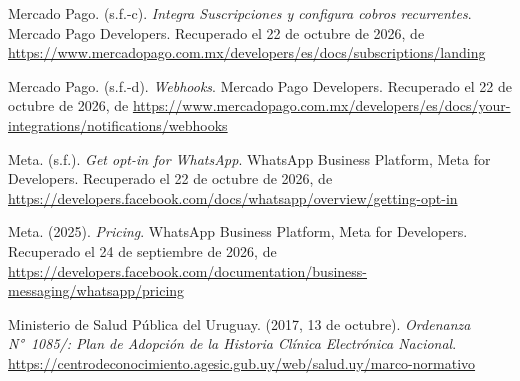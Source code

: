 \documentclass[12pt, a4paper]{article}
\begin{document}
\begin{list}{}{\setlength{\leftmargin}{1.27cm}\setlength{\itemindent}{-1.27cm}%
  \setlength{\labelwidth}{0pt}\setlength{\labelsep}{0pt}\setlength{\itemsep}{6pt}}
\item Mercado Pago. (s.f.-c). \textit{Integra Suscripciones y configura
  cobros recurrentes}. Mercado Pago Developers. Recuperado el 22 de octubre de 2026, de \url{https://www.mercadopago.com.mx/developers/es/docs/subscriptions/landing}
 
 
\item Mercado Pago. (s.f.-d). \textit{Webhooks}. Mercado Pago Developers.
  Recuperado el 22 de octubre de 2026, de \url{https://www.mercadopago.com.mx/developers/es/docs/your-integrations/notifications/webhooks}
 
 
\item Meta. (s.f.). \textit{Get opt-in for WhatsApp}. WhatsApp Business
  Platform, Meta for Developers. Recuperado el 22 de octubre de 2026, de \url{https://developers.facebook.com/docs/whatsapp/overview/getting-opt-in}
 
 
\item Meta. (2025). \textit{Pricing}. WhatsApp Business Platform,
  Meta for Developers. Recuperado el 24 de septiembre de 2026, de
\url{https://developers.facebook.com/documentation/business-messaging/whatsapp/pricing}
 
 
\item Ministerio de Salud Pública del Uruguay. (2017, 13 de
  octubre). \textit{Ordenanza N°~1085/: Plan de Adopción de la
  Historia Clínica
  Electrónica Nacional}.
\url{https://centrodeconocimiento.agesic.gub.uy/web/salud.uy/marco-normativo}




\end{list}
\end{document}
